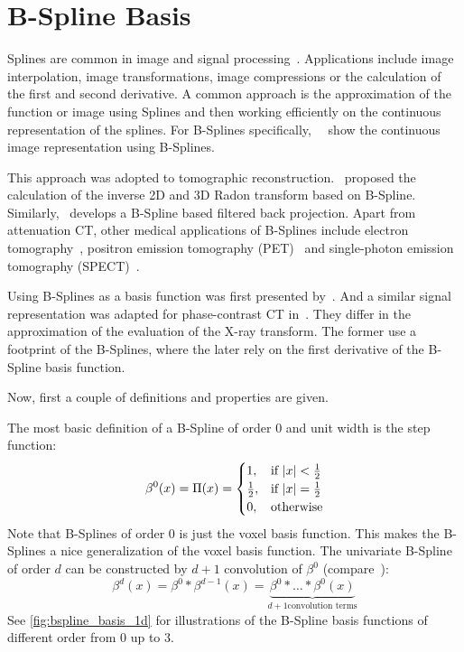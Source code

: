 \section{B-Spline Basis}\label{sec:bspline_basis}

Splines are common in image and signal processing~\cite{unser_splines_1999}. Applications include
image interpolation, image transformations, image compressions or the calculation of the first and
second derivative. A common approach is the approximation of the function or image using Splines and
then working efficiently on the continuous representation of the splines. For B-Splines
specifically,~\citeauthor*{unser_fast_1991}~\cite{unser_fast_1991} show the continuous image
representation using B-Splines.

This approach was adopted to tomographic reconstruction.~\cite{la_riviere_spline-based_1998}
proposed the calculation of the inverse 2D and 3D Radon transform based on B-Spline.
Similarly,~\cite{horbelt_discretization_2002} develops a B-Spline based filtered back projection.
Apart from attenuation CT, other medical applications of B-Splines include electron
tomography~\cite{tran_robust_2013, tran_inverse_2014}, positron emission tomography
(PET)~\cite{nichols_spatiotemporal_2002, li_fast_2007, verhaeghe_investigation_2007} and
single-photon emission tomography (SPECT)~\cite{guedon_b-spline_1991, reutter_fully_2007}.

Using B-Splines as a basis function was first presented by~\cite{momey_new_2011,
	momey_b-spline_2012, momey_spline_2015}. And a similar signal representation was adapted for
phase-contrast CT in~\cite{nilchian_fast_2013, nilchian_differential_2012, nilchian_spline_2015}.
They differ in the approximation of the evaluation of the X-ray transform. The former use a
footprint of the B-Splines, where the later rely on the first derivative of the B-Spline basis
function.

Now, first a couple of definitions and properties are given.
\begin{definition}[B-Spline]
	The most basic definition of a B-Spline of order \(0\) and unit width is the step function:
	\[
		\beta^0(x) = \Pi(x) =
		\begin{cases}
			1,           & \text{if } \lvert x\rvert < \frac{1}{2} \\
			\frac{1}{2}, & \text{if } \lvert x\rvert = \frac{1}{2} \\
			0,           & \text{otherwise}
		\end{cases}
	\]
	Note that B-Splines of order \(0\) is just the voxel basis function. This makes the
	B-Splines a nice generalization of the voxel basis function. The univariate B-Spline of
	order \(d\) can be constructed by \(d + 1\) convolution of
	\(\beta^0\) (compare~\cite{momey_new_2011}):
	\[
		\beta^d(x) = \beta^0 * \beta^{d-1}(x) = \underbrace{\beta^0 * \dots * \beta^0(x)}_{d+1 \text{convolution terms}}
	\]
	See \autoref{fig:bspline_basis_1d} for illustrations of the B-Spline basis functions of
	different order from \(0\) up to \(3\).
\end{definition}

